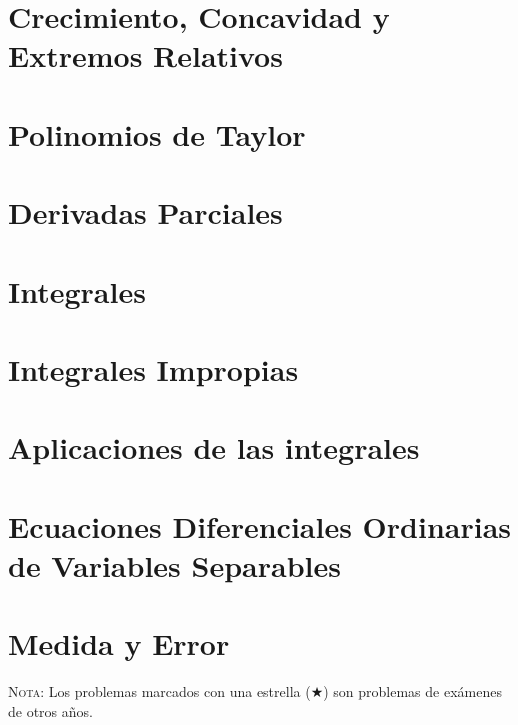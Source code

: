\documentclass[a4paper,titlepage]{article}
\begin{document}
\section{Crecimiento, Concavidad y Extremos Relativos}
\begin{enumerate}[leftmargin=*]
\end{enumerate}

\section{Polinomios de Taylor}
\begin{enumerate}[leftmargin=*]
\end{enumerate}

\section{Derivadas Parciales}
\begin{enumerate}[leftmargin=*]
\end{enumerate}

\section{Integrales}
\begin{enumerate}[leftmargin=*]
\end{enumerate}

\section{Integrales Impropias}
\begin{enumerate}[leftmargin=*]
\end{enumerate}

\section{Aplicaciones de las integrales}
\begin{enumerate}[leftmargin=*]
\end{enumerate}

\section{Ecuaciones Diferenciales Ordinarias de Variables Separables}
\begin{enumerate}[leftmargin=*]
\end{enumerate}

\section{Medida y Error}
\begin{enumerate}[leftmargin=*]
\end{enumerate}

\vspace{2cm}

\textsc{Nota}: Los problemas marcados con una estrella ($\bigstar$) son problemas de
exámenes de otros años.
\end{document}
